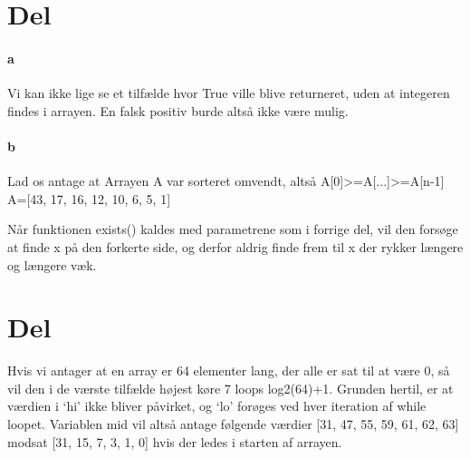 \documentclass{article}
\begin{document}
\section{Del}
\paragraph{a}

Vi kan ikke lige se et tilfælde hvor True ville blive returneret, uden at integeren findes i arrayen. En falsk positiv burde altså ikke være mulig.

\paragraph{b} Lad os antage at Arrayen A var sorteret omvendt, altså
A[0]>=A[...]>=A[n-1] A=[43, 17, 16, 12, 10, 6, 5, 1]

Når funktionen exists() kaldes med parametrene som i forrige del, vil den forsøge at finde x på den forkerte side, og derfor aldrig finde frem til x der rykker længere og længere væk.


\section{Del}


Hvis vi antager at en array er 64 elementer lang, der alle er sat til at være 0, så vil den i de værste tilfælde højest køre 7 loops log2(64)+1. Grunden hertil, er at værdien i `hi' ikke bliver påvirket, og `lo' forøges ved hver iteration af while loopet. Variablen mid vil altså antage følgende værdier [31, 47, 55, 59, 61, 62, 63] modsat [31, 15, 7, 3, 1, 0] hvis der ledes i starten af arrayen.
\end{document}

